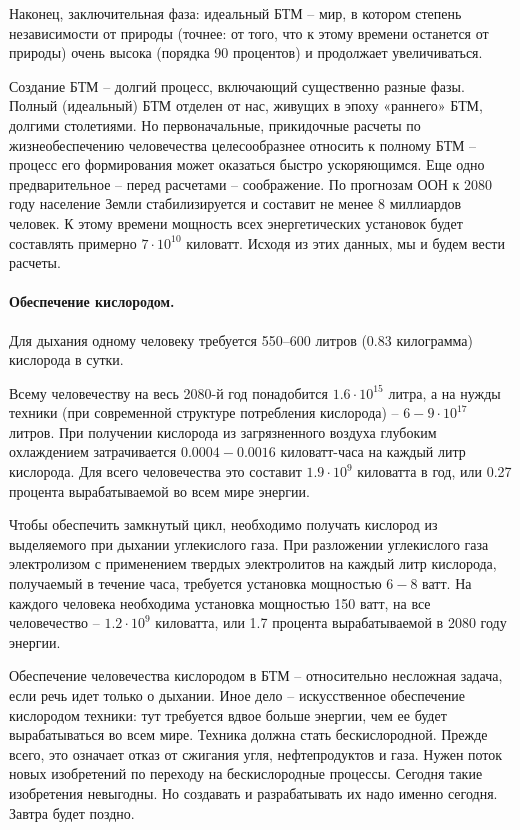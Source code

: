 \documentclass[11pt,a4paper]{article}
\begin{document}
Наконец, заключительная фаза: идеальный БТМ -- мир, в котором степень
независимости от природы (точнее: от того, что к этому времени останется от
природы) очень высока (порядка 90 процентов) и продолжает увеличиваться.

Создание БТМ -- долгий процесс, включающий существенно разные фазы. Полный
(идеальный) БТМ отделен от нас, живущих в эпоху «раннего» БТМ, долгими
столетиями. Но первоначальные, прикидочные расчеты по жизнеобеспечению
человечества целесообразнее относить к полному БТМ -- процесс его формирования
может оказаться быстро ускоряющимся. Еще одно предварительное -- перед
расчетами -- соображение. По прогнозам ООН к 2080 году население Земли
стабилизируется и составит не менее 8 миллиардов человек. К этому времени
мощность всех энергетических установок будет составлять примерно $7\cdot
10^{10}$ киловатт. Исходя из этих данных, мы и будем вести расчеты.

\paragraph{Обеспечение кислородом.}
Для дыхания одному человеку требуется 550--600 литров (0.83 килограмма)
кислорода в сутки.

Всему человечеству на весь 2080-й год понадобится $1.6\cdot 10^{15}$ литра, а
на нужды техники (при современной структуре потребления кислорода) --
$6-9\cdot 10^{17}$ литров. При получении кислорода из загрязненного воздуха
глубоким охлаждением затрачивается $0.0004-0.0016$ киловатт-часа на каждый
литр кислорода. Для всего человечества это составит $1.9\cdot 10^9$ киловатта в
год, или 0.27 процента вырабатываемой во всем мире энергии.

Чтобы обеспечить замкнутый цикл, необходимо получать кислород из выделяемого
при дыхании углекислого газа. При разложении углекислого газа электролизом с
применением твердых электролитов на каждый литр кислорода, получаемый в
течение часа, требуется установка мощностью $6-8$ ватт. На каждого человека
необходима установка мощностью 150 ватт, на все человечество -- $1.2\cdot 10^9$
киловатта, или 1.7 процента вырабатываемой в 2080 году энергии.

Обеспечение человечества кислородом в БТМ -- относительно несложная задача,
если речь идет только о дыхании. Иное дело -- искусственное обеспечение
кислородом техники: тут требуется вдвое больше энергии, чем ее будет
вырабатываться во всем мире.  Техника должна стать бескислородной. Прежде
всего, это означает отказ от сжигания угля, нефтепродуктов и газа. Нужен поток
новых изобретений по переходу на бескислородные процессы. Сегодня такие
изобретения невыгодны. Но создавать и разрабатывать их надо именно сегодня.
Завтра будет поздно.
\end{document}
